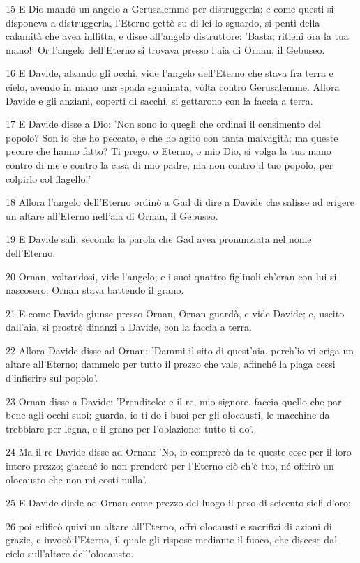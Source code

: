 \par 15 E Dio mandò un angelo a Gerusalemme per distruggerla; e come questi si disponeva a distruggerla, l'Eterno gettò su di lei lo sguardo, si pentì della calamità che avea inflitta, e disse all'angelo distruttore: 'Basta; ritieni ora la tua mano!' Or l'angelo dell'Eterno si trovava presso l'aia di Ornan, il Gebuseo.
\par 16 E Davide, alzando gli occhi, vide l'angelo dell'Eterno che stava fra terra e cielo, avendo in mano una spada sguainata, vòlta contro Gerusalemme. Allora Davide e gli anziani, coperti di sacchi, si gettarono con la faccia a terra.
\par 17 E Davide disse a Dio: 'Non sono io quegli che ordinai il censimento del popolo? Son io che ho peccato, e che ho agito con tanta malvagità; ma queste pecore che hanno fatto? Ti prego, o Eterno, o mio Dio, si volga la tua mano contro di me e contro la casa di mio padre, ma non contro il tuo popolo, per colpirlo col flagello!'
\par 18 Allora l'angelo dell'Eterno ordinò a Gad di dire a Davide che salisse ad erigere un altare all'Eterno nell'aia di Ornan, il Gebuseo.
\par 19 E Davide salì, secondo la parola che Gad avea pronunziata nel nome dell'Eterno.
\par 20 Ornan, voltandosi, vide l'angelo; e i suoi quattro figliuoli ch'eran con lui si nascosero. Ornan stava battendo il grano.
\par 21 E come Davide giunse presso Ornan, Ornan guardò, e vide Davide; e, uscito dall'aia, si prostrò dinanzi a Davide, con la faccia a terra.
\par 22 Allora Davide disse ad Ornan: 'Dammi il sito di quest'aia, perch'io vi eriga un altare all'Eterno; dammelo per tutto il prezzo che vale, affinché la piaga cessi d'infierire sul popolo'.
\par 23 Ornan disse a Davide: 'Prenditelo; e il re, mio signore, faccia quello che par bene agli occhi suoi; guarda, io ti do i buoi per gli olocausti, le macchine da trebbiare per legna, e il grano per l'oblazione; tutto ti do'.
\par 24 Ma il re Davide disse ad Ornan: 'No, io comprerò da te queste cose per il loro intero prezzo; giacché io non prenderò per l'Eterno ciò ch'è tuo, né offrirò un olocausto che non mi costi nulla'.
\par 25 E Davide diede ad Ornan come prezzo del luogo il peso di seicento sicli d'oro;
\par 26 poi edificò quivi un altare all'Eterno, offrì olocausti e sacrifizi di azioni di grazie, e invocò l'Eterno, il quale gli rispose mediante il fuoco, che discese dal cielo sull'altare dell'olocausto.
